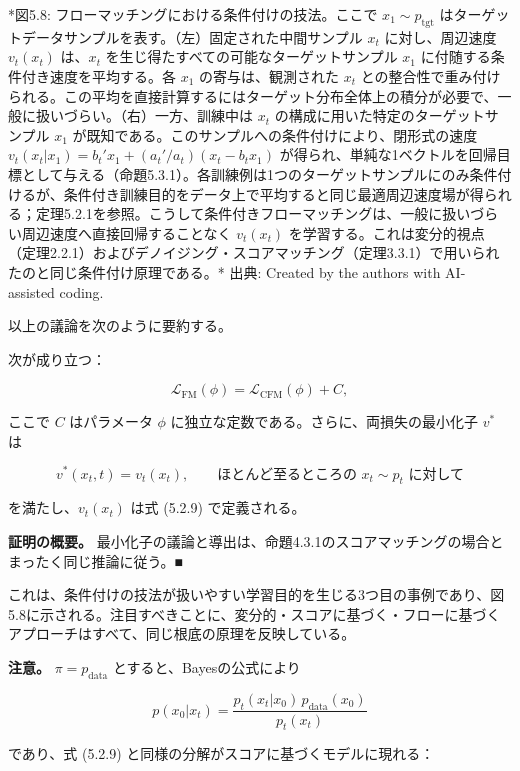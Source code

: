 *図5.8: フローマッチングにおける条件付けの技法。ここで $x_1\sim p_{\mathrm{tgt}}$ はターゲットデータサンプルを表す。（左）固定された中間サンプル $x_t$ に対し、周辺速度 $v_t(x_t)$ は、$x_t$ を生じ得たすべての可能なターゲットサンプル $x_1$ に付随する条件付き速度を平均する。各 $x_1$ の寄与は、観測された $x_t$ との整合性で重み付けられる。この平均を直接計算するにはターゲット分布全体上の積分が必要で、一般に扱いづらい。（右）一方、訓練中は $x_t$ の構成に用いた特定のターゲットサンプル $x_1$ が既知である。このサンプルへの条件付けにより、閉形式の速度 $v_t(x_t|x_1)=b_t'x_1+(a_t'/a_t)(x_t-b_t x_1)$ が得られ、単純な1ベクトルを回帰目標として与える（命題5.3.1）。各訓練例は1つのターゲットサンプルにのみ条件付けるが、条件付き訓練目的をデータ上で平均すると同じ最適周辺速度場が得られる；定理5.2.1を参照。こうして条件付きフローマッチングは、一般に扱いづらい周辺速度へ直接回帰することなく $v_t(x_t)$ を学習する。これは変分的視点（定理2.2.1）およびデノイジング・スコアマッチング（定理3.3.1）で用いられたのと同じ条件付け原理である。*
出典: Created by the authors with AI-assisted coding.

以上の議論を次のように要約する。

\begin{propositionbox}
次が成り立つ：

\[
\mathcal{L}_{\mathrm{FM}}(\phi)=\mathcal{L}_{\mathrm{CFM}}(\phi)+C,
\]

ここで $C$ はパラメータ $\phi$ に独立な定数である。さらに、両損失の最小化子 $v^*$ は

\[
v^*(x_t,t)=v_t(x_t),\qquad\text{ほとんど至るところの }x_t\sim p_t\text{ に対して}
\]

を満たし、$v_t(x_t)$ は式 (5.2.9) で定義される。
\end{propositionbox}


\textbf{証明の概要。} 最小化子の議論と導出は、命題4.3.1のスコアマッチングの場合とまったく同じ推論に従う。■

これは、条件付けの技法が扱いやすい学習目的を生じる3つ目の事例であり、図5.8に示される。注目すべきことに、変分的・スコアに基づく・フローに基づくアプローチはすべて、同じ根底の原理を反映している。

\textbf{注意。} $\pi=p_{\mathrm{data}}$ とすると、Bayesの公式により

\[
p(x_0|x_t)=\frac{p_t(x_t|x_0)\,p_{\mathrm{data}}(x_0)}{p_t(x_t)}
\]


であり、式 (5.2.9) と同様の分解がスコアに基づくモデルに現れる：

